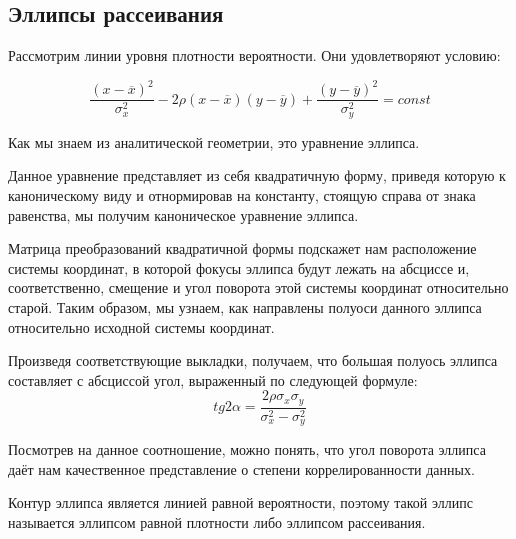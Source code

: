 \subsection{Эллипсы рассеивания}

Рассмотрим линии уровня плотности вероятности. Они удовлетворяют условию:

\begin{equation}
	\frac{(x - \overline{x})^2}{\sigma_x^2} - 2 \rho (x - \overline{x}) (y - \overline{y}) + \frac{(y - \overline{y})^2}{\sigma_y^2} = const
\end{equation}

Как мы знаем из аналитической геометрии, это уравнение эллипса.

Данное уравнение представляет из себя квадратичную форму, приведя которую к каноническому виду и отнормировав на константу, стоящую справа от знака равенства, мы получим каноническое уравнение эллипса.

Матрица преобразований квадратичной формы подскажет нам расположение системы координат, в которой фокусы эллипса будут лежать на абсциссе и, соответственно, смещение и угол поворота этой системы координат относительно старой. Таким образом, мы узнаем, как направлены полуоси данного эллипса относительно исходной системы координат.

Произведя соответствующие выкладки, получаем, что большая полуось эллипса составляет с абсциссой угол, выраженный по следующей формуле:
\begin{equation}
	tg 2\alpha = \frac{2 \rho \sigma_x \sigma_y}{\sigma_x^2 - \sigma_y^2}
\end{equation}

Посмотрев на данное соотношение, можно понять, что угол поворота эллипса даёт нам качественное представление о степени коррелированности данных.

Контур эллипса является линией равной вероятности, поэтому такой эллипс называется эллипсом равной плотности либо эллипсом рассеивания.
